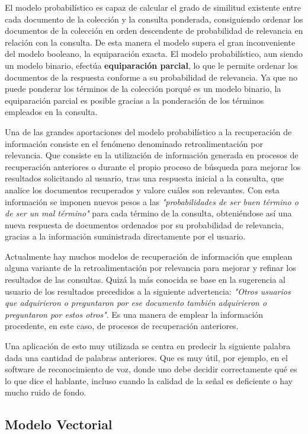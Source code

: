 \documentclass[titlepage]{article}
\begin{document}
	El modelo probabilístico es capaz de calcular el grado de similitud existente entre cada documento de la colección y la consulta ponderada, consiguiendo ordenar los documentos de la colección en orden descendente de probabilidad de relevancia en relación con la consulta. De esta manera el modelo supera el gran inconveniente del modelo booleano, la equiparación exacta. El modelo probabilístico, aun siendo un modelo binario, efectúa \textbf{equiparación parcial}, lo que le permite ordenar los documentos de la respuesta conforme a su probabilidad de relevancia. Ya que no puede ponderar los términos de la colección porqué es un modelo binario, la equiparación parcial es posible gracias a la ponderación de los términos empleados en la consulta.
	
	Una de las grandes aportaciones del modelo probabilístico a la recuperación de información consiste en el fenómeno denominado retroalimentación por relevancia. Que consiste en la utilización de información generada en procesos de recuperación anteriores o durante el propio proceso de búsqueda para mejorar los resultados solicitando al usuario, tras una respuesta inicial a la consulta, que analice los documentos recuperados y valore cuáles son relevantes. Con esta información se imponen nuevos pesos a las \textit{"probabilidades de ser buen término o de ser un mal término"} para cada término de la consulta, obteniéndose así una nueva respuesta de documentos ordenados por su probabilidad de relevancia, gracias a la información suministrada directamente por el usuario.
	
	Actualmente hay muchos modelos de recuperación de información que emplean alguna variante de la retroalimentación por relevancia para mejorar y refinar los resultados de las consultas. Quizá la más conocida se base en la sugerencia al usuario de los resultados precedidos a la siguiente advertencia: \textit{"Otros usuarios que adquirieron o preguntaron por ese documento también adquirieron o preguntaron por estos otros"}. Es una manera de emplear la información procedente, en este caso, de procesos de recuperación anteriores.
	
	Una aplicación de esto muy utilizada se centra en predecir la siguiente palabra dada una cantidad de palabras anteriores. Que es muy útil, por ejemplo, en el software de reconocimiento de voz, donde uno debe decidir correctamente qué es lo que dice el hablante, incluso cuando la calidad de la señal es deficiente o hay mucho ruido de fondo.
	
	\subsection{Modelo Vectorial}
	
\end{document}
